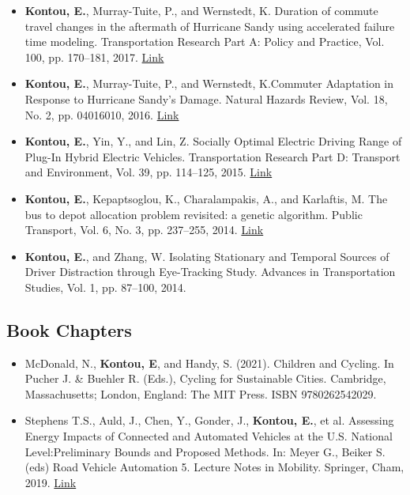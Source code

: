 \documentclass[margin,line]{resume}
\begin{document}
\begin{resume}
\begin{itemize}
\item {\bf Kontou, E.}, Murray-Tuite, P., and Wernstedt, K. Duration of commute travel changes in the aftermath of Hurricane Sandy using accelerated failure time modeling. Transportation Research Part A: Policy and Practice, Vol. 100, pp. 170–181, 2017. \href{https://doi.org/10.1016/j.tra. 2017.04.015}{Link}
\item {\bf Kontou, E.}, Murray-Tuite, P., and Wernstedt, K.Commuter Adaptation in Response to Hurricane Sandy’s Damage. Natural Hazards Review, Vol. 18, No. 2, pp. 04016010, 2016. \href{https://doi.org/10.1061/(ASCE)NH.1527-6996.0000231}{Link}
\item {\bf Kontou, E.}, Yin, Y., and Lin, Z. Socially Optimal Electric Driving Range of Plug-In Hybrid Electric Vehicles. Transportation Research Part D: Transport and Environment, Vol. 39, pp. 114–125, 2015. \href{https://doi.org/10.1016/j.trd.2015.07.002}{Link}
\item {\bf Kontou, E.}, Kepaptsoglou, K., Charalampakis, A., and Karlaftis, M. The bus to depot allocation problem revisited: a genetic algorithm. Public Transport, Vol. 6, No. 3, pp. 237–255, 2014. \href{https://doi.org/10.1007/s12469-013-0078-4}{Link}
\item {\bf Kontou, E.}, and Zhang, W. Isolating Stationary and Temporal Sources of Driver Distraction through Eye-Tracking Study. Advances in Transportation Studies, Vol. 1, pp. 87–100, 2014.
\end{itemize}
	    \vspace{-0.3in}
   \subsection{\mysidestyle \bf Book Chapters}
\begin{itemize}
\item McDonald, N., {\bf Kontou, E}, and Handy, S. (2021). Children and Cycling. In Pucher J. & Buehler R. (Eds.), Cycling for Sustainable Cities. Cambridge, Massachusetts; London, England: The MIT Press. ISBN 9780262542029.
\item Stephens T.S., Auld, J., Chen, Y., Gonder, J., {\bf Kontou, E.}, et al. Assessing Energy Impacts of Connected and Automated Vehicles at the U.S. National Level:Preliminary Bounds and Proposed Methods. In: Meyer G., Beiker S. (eds) Road Vehicle Automation 5. Lecture Notes in Mobility. Springer, Cham, 2019. \href{https://link.springer.com/chapter/10.1007/978-3-319-94896-6_10}{Link}
\end{itemize}
    \vspace{-0.3in}

\end{resume}
\end{document}
